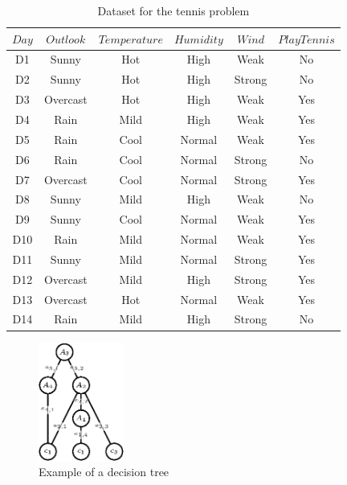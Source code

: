 \documentclass[10pt, letterpaper]{report}
\begin{document}
\begin{table}[h]
	\centering
	\caption{Dataset for the tennis problem}
	\label{tab:tennis_data_big}
	\begin{tabular}{cccccc}
		\toprule
		$Day$ & $Outlook$ & $Temperature$ & $Humidity$ & $Wind$ & $PlayTennis$ \\
		\midrule
		D1    & Sunny     & Hot           & High       & Weak   & No           \\
		D2    & Sunny     & Hot           & High       & Strong & No           \\
		D3    & Overcast  & Hot           & High       & Weak   & Yes          \\
		D4    & Rain      & Mild          & High       & Weak   & Yes          \\
		D5    & Rain      & Cool          & Normal     & Weak   & Yes          \\
		D6    & Rain      & Cool          & Normal     & Strong & No           \\
		D7    & Overcast  & Cool          & Normal     & Strong & Yes          \\
		D8    & Sunny     & Mild          & High       & Weak   & No           \\
		D9    & Sunny     & Cool          & Normal     & Weak   & Yes          \\
		D10   & Rain      & Mild          & Normal     & Weak   & Yes          \\
		D11   & Sunny     & Mild          & Normal     & Strong & Yes          \\
		D12   & Overcast  & Mild          & High       & Strong & Yes          \\
		D13   & Overcast  & Hot           & Normal     & Weak   & Yes          \\
		D14   & Rain      & Mild          & High       & Strong & No           \\
		\bottomrule
	\end{tabular}
\end{table}

\begin{figure}[h!]
	\centering
	\includegraphics[width=0.25\textwidth]{images/decision_tree.eps}
	\caption{Example of a decision tree}
	\label{img:dec_tree}
\end{figure}
\end{document}
